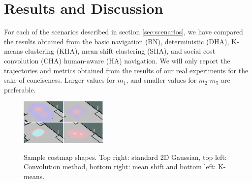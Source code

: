 \section{Results and Discussion}
\label{res}

For each of the scenarios described in section \ref{sec:scenarios}, we have compared the results obtained from the basic navigation (BN), deterministic (DHA), K-means clustering (KHA), mean shift clustering (SHA), and social cost convolution (CHA) human-aware (HA) navigation. We will only report the trajectories and metrics obtained from the results of our real experiments for the sake of conciseness. Larger values for $m_{1}$, and smaller values for $m_{2}$-$m_{5}$ are preferable.


\begin{figure}
\centering
{\includegraphics[width=0.38\textwidth]{pictures/all.eps}\label{fig:costmapPic}}%

\caption{Sample costmap shapes. Top right: standard 2D Gaussian, top left: Convolution method, bottom right: mean shift and bottom left: K-means.}
\label{fig:costmapPic}
\end{figure}


